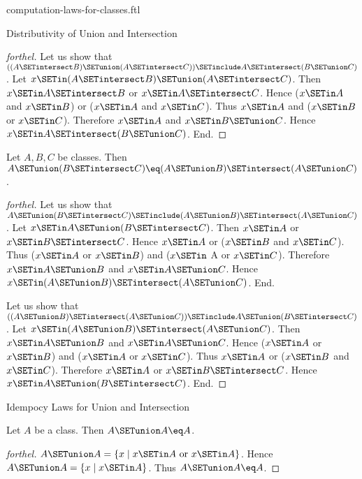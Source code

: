 \documentclass{naproche-library}
\begin{document}
\begin{smodule}[title=Computation Laws For Classes]{computation-laws-for-classes.ftl}
\begin{sfragment}{Distributivity of Union and Intersection}
\begin{proof}[forthel]
    Let us show that $((A \SETintersect B) \SETunion (A \SETintersect C)) \SETinclude A \SETintersect (B \SETunion C)$. %
      Let $x \SETin (A \SETintersect B) \SETunion (A \SETintersect C)$.
      Then $x \SETin A \SETintersect B$ or $x \SETin A \SETintersect C$.
      Hence ($x \SETin A$ and $x \SETin B$) or ($x \SETin A$ and $x \SETin C$).
      Thus $x \SETin A$ and ($x \SETin B$ or $x \SETin C$).
      Therefore $x \SETin A$ and $x \SETin B \SETunion C$.
      Hence$ x \SETin A \SETintersect (B \SETunion C)$.
    End.
  \end{proof}

  \begin{proposition}[forthel,id=FOUNDATIONS_02_5937390721957888]
    Let $A, B, C$ be classes.
    Then $A \SETunion (B \SETintersect C) \eq (A \SETunion B) \SETintersect (A \SETunion C)$.
  \end{proposition}
  \begin{proof}[forthel]
    Let us show that $A \SETunion (B \SETintersect C) \SETinclude (A \SETunion B) \SETintersect (A \SETunion C)$.
      Let $x \SETin A \SETunion (B \SETintersect C)$.
      Then $x \SETin A$ or $x \SETin B \SETintersect C$.
      Hence $x \SETin A$ or ($x \SETin B$ and $x \SETin C$).
      Thus ($x \SETin A$ or $x \SETin B$) and ($x \SETin$ A or $x \SETin C$).
      Therefore $x \SETin A \SETunion B$ and $x \SETin A \SETunion C$.
      Hence $x \SETin (A \SETunion B) \SETintersect (A \SETunion C)$.
    End.

    Let us show that $((A \SETunion B) \SETintersect (A \SETunion C)) \SETinclude A \SETunion (B \SETintersect C)$. %
      Let $x \SETin (A \SETunion B) \SETintersect (A \SETunion C)$.
      Then $x \SETin A \SETunion B$ and $x \SETin A \SETunion C$.
      Hence ($x \SETin A$ or $x \SETin B$) and ($x \SETin A$ or $x \SETin C$).
      Thus $x \SETin A$ or ($x \SETin B$ and $x \SETin C$).
      Therefore $x \SETin A$ or $x \SETin B \SETintersect C$.
      Hence $x \SETin A \SETunion (B \SETintersect C)$.
    End.
  \end{proof}
\end{sfragment}

\begin{sfragment}{Idempocy Laws for Union and Intersection}
  \begin{proposition}[forthel,id=FOUNDATIONS_02_2096996737351680]
    Let $A$ be a class.
    Then $A \SETunion A \eq A$.
  \end{proposition}
  \begin{proof}[forthel]
    $A \SETunion A = \{x \mid x \SETin A\text{ or }x \SETin A \}$.
    Hence $A \SETunion A = \{ x \mid x \SETin A \}$.
    Thus $A \SETunion A \eq A$.
  \end{proof}


\end{sfragment}
\end{smodule}
\end{document}
